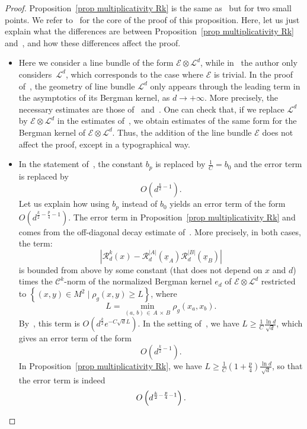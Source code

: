 \documentclass[AHL,Unicode,longabstracts,published]{cedram}
\newcommand{\E}{\mathcal{E}}
\renewcommand{\L}{\mathcal{L}}
\newcommand{\clC}{\mathcal{C}}
\newcommand{\clR}{\mathcal{R}}
\newcommand{\norm}[1]{\left\lvert #1 \right\rvert}
\renewcommand{\geq}{\geqslant}
\begin{document}
\begin{proof}
Proposition~\ref{prop multiplicativity Rk} is the same as~\cite[Proposition~3.2]{Anc2019} but for two small points. We refer to~\cite{Anc2019} for the core of the proof of this proposition. Here, let us just explain what the differences are between Proposition~\ref{prop multiplicativity Rk} and~\cite[Proposition~3.2]{Anc2019}, and how these differences affect the proof.
\begin{itemize}
\item Here we consider a line bundle of the form $\E \otimes \L^d$, while in~\cite{Anc2019} the author only considers~$\L^d$, which corresponds to the case where $\E$ is trivial. In the proof of~\cite[Proposition~3.2]{Anc2019}, the geometry of line bundle $\L^d$ only appears through the leading term in the asymptotics of its Bergman kernel, as $d \to +\infty$. More precisely, the necessary estimates are those of~\cite[Theorem~4.2.1]{MM2007} and~\cite[Theorem~1]{MM2015}. One can check that, if we replace $\L^d$ by $\E \otimes \L^d$ in the estimates of~\cite{MM2007,MM2015}, we obtain estimates of the same form for the Bergman kernel of $\E \otimes \L^d$. Thus, the addition of the line bundle $\E$ does not affect the proof, except in a typographical way.

\item In the statement of~\cite[Proposition~3.2]{Anc2019}, the constant $b_p$ is replaced by $\tfrac{1}{C}=b_0$ and the error term is replaced by
\[
O\left(d^{\frac{k}{2}-1}\right).
\]
Let us explain how using $b_p$ instead of $b_0$ yields an error term of the form $O(d^{\frac{k}{2}-\frac{p}{4}-1})$. The error term in Proposition~\ref{prop multiplicativity Rk} and~\cite[Proposition~3.2]{Anc2019} comes from the off-diagonal decay estimate of~\cite[Theorem~1]{MM2015}. More precisely, in both cases, the term:
\[
\norm{\clR^k_d(x) - \clR^{\norm{A}}_d(\underline{x}_A)\clR^{\norm{B}}_d(\underline{x}_B)}
\]
is bounded from above by some constant (that does not depend on $x$ and $d$) times the $\clC^k$-norm of the normalized Bergman kernel $e_d$ of $\E \otimes \L^d$ restricted to $\left\{(x,y) \in M^2 \mid \rho_g(x,y) \geq L \right\}$, where
\[
L = \min_{(a,\,b)\,\in\,A\,\times\,B} \rho_g(x_a,x_b).
\]
By~\cite[Theorem~1]{MM2015}, this term is $O(d^\frac{k}{2}e^{-C\sqrt{d}L})$. In the setting of~\cite[Proposition~3.2]{Anc2019}, we have $L \geq \tfrac{1}{C} \tfrac{\ln d}{\sqrt{d}}$, which gives an error term of the form
\[
O\left(d^{\frac{k}{2}-1}\right).
\]
In Proposition~\ref{prop multiplicativity Rk}, we have $L \geq \frac{1}{C}(1+\frac{p}{4})\tfrac{\ln d}{\sqrt{d}}$, so that the error term is indeed 
\[
O\left(d^{\frac{k}{2}-\frac{p}{4}-1}\right).\qedhere
\]
\end{itemize}
\end{proof}
\end{document}

